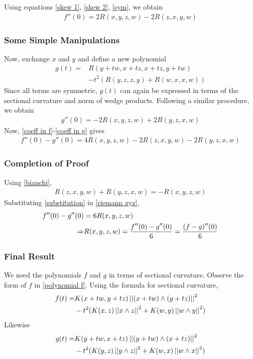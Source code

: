 \begin{frame}
Using equations \ref{skew	1}, \ref{skew	2}, \ref{sym}, we obtain
\begin{align}
\label{coeff in f}
f''(0)=2R(x,y,z,w)-2R(z,x,y,w)
\end{align}
\frametitle{Some Simple Manipulations}
Now, exchange $x$ and $y$ and define a new polynomial
\begin{align}
\label{polynomial g}
g(t)=&R(y+tw,x+tz,x+tz,y+tw)\\
&-t^2(R(y,z,z,y)+R(w,x,x,w))
\end{align}
Since all terms are symmetric, $g(t)$ can again be expressed in terms of the sectional curvature and norm of wedge products. Following a similar procedure, we obtain
\begin{align}
\label{coeff in g}
g''(0)=-2R(x,y,z,w)+2R(y,z,x,w)
\end{align}
\pause
Now, \ref{coeff in f}-\ref{coeff in g} gives
\begin{align}
\label{riemann xyz}
f''(0)-g''(0)=4R(x,y,z,w)-2R(z,x,y,w)-2R(y,z,x,w)
\end{align}
\end{frame}

\begin{frame}
\frametitle{Completion of Proof}
Using \ref{bianchi},
\begin{align}
\label{substitution}
R(z,x,y,w)+R(y,z,x,w)=-R(x,y,z,w)
\end{align}
Substituting \ref{substitution} in \ref{riemann xyz},
\begin{align}
\label{final form}
f''(0)-g''(0)&=6R(x,y,z,w)\\
\Rightarrow &R(x,y,z,w)=\frac{\displaystyle f''(0)-g''(0)}{\displaystyle 6}=\frac{\displaystyle (f-g)''(0)}{\displaystyle 6}
\end{align}
\end{frame}

\begin{frame}
\frametitle{Final Result}
We need the polynomials $f$ and $g$ in terms of sectional curvature. Observe the form of $f$ in \ref{polynomial f}. Using the formula for sectional curvature,
\begin{align}
\label{f as sectional}
f(t)=&K(x+tw,y+tz)\left\lvert\left\lvert (x+tw)\wedge(y+tz) \right\rvert\right\rvert^2\\
&-t^2(K(x,z)\left\lvert\left\lvert x\wedge z \right\rvert\right\rvert^2+K(w,y)\left\lvert\left\lvert w\wedge y \right\rvert\right\rvert^2)
\end{align}
Likewise
\begin{align}
\label{g as sectional}
g(t)=&K(y+tw,x+tz)\left\lvert\left\lvert (y+tw)\wedge(x+tz) \right\rvert\right\rvert^2\\
&-t^2(K(y,z)\left\lvert\left\lvert y\wedge z \right\rvert\right\rvert^2+K(w,x)\left\lvert\left\lvert w\wedge x \right\rvert\right\rvert^2)
\end{align}
\end{frame}


